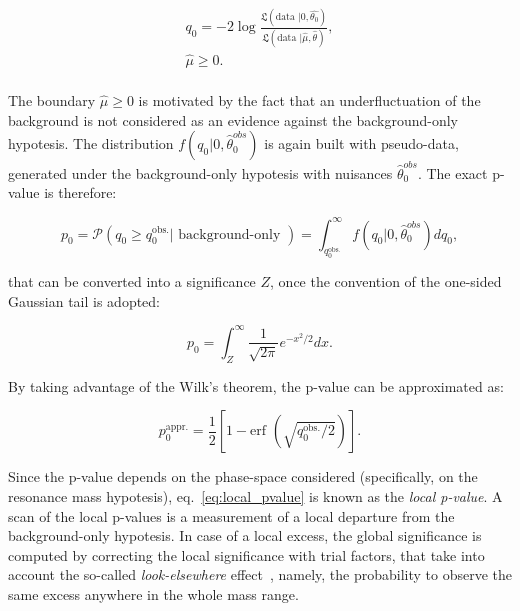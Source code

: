 \begin{equation}
\begin{gathered}
{q}_{0} = -2 \log { \frac{\mathfrak{L} (\text{data }| 0, \hat{\theta_{0}}) }{ \mathfrak{L} (\text{data }| \hat{\mu}, \hat{\theta})  } },\\
\hat{\mu} \geq 0.\\
\end{gathered}
\end{equation}

\noindent The boundary $\hat{\mu} \geq 0$ is motivated by the fact that an underfluctuation of the background is not considered as an evidence against the background-only hypotesis. The distribution $f (q_0 | 0, \hat{\theta}_0^{obs})$ is again built with pseudo-data, generated under the background-only hypotesis with nuisances $\hat{\theta}_0^{obs}$. The exact p-value is therefore:

\begin{equation}
p_0 = \mathcal{P} \left( q_0 \geq q_0^{\text{obs.}} | \text{ background-only } \right) = \int_{q_0^{\text{obs.}}}^{\infty} f (q_0 | 0, \hat{\theta}_0^{obs}) d q_0,
\label{eq:local_pvalue}
\end{equation}

\noindent that can be converted into a significance $Z$, once the convention of the one-sided Gaussian tail is adopted:

\begin{equation}
p_0 = \int_Z^{\infty} \frac{1}{\sqrt{2 \pi}} e^{-x^2/2} dx.
\end{equation} 

\noindent By taking advantage of the Wilk's theorem, the p-value can be approximated as:

\begin{equation}
p_0^{\text{appr.}} = \frac{1}{2} \left[ 1 - \text{erf } \left( \sqrt{q_0^{\text{obs.}}/2}\right) \right].
\end{equation} 

\noindent Since the p-value depends on the phase-space considered (specifically, on the resonance mass hypotesis), eq.~\ref{eq:local_pvalue} is known as the \emph{local p-value}. A scan of the local p-values is a measurement of a local departure from the background-only hypotesis. In case of a local excess, the global significance is computed by correcting the local significance with trial factors, that take into account the so-called \emph{look-elsewhere} effect~\cite{Gross2010}, namely, the probability to observe the same excess anywhere in the whole mass range.

